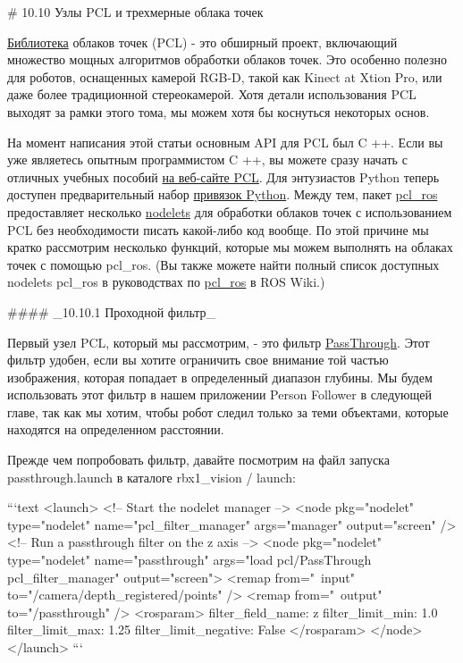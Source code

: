 # 10.10 Узлы PCL и трехмерные облака точек


\href{http://www.pointclouds.org/}{Библиотека} облаков точек (PCL) - это обширный проект, включающий множество мощных алгоритмов обработки облаков точек. Это особенно полезно для роботов, оснащенных камерой RGB-D, такой как Kinect at Xtion Pro, или даже более традиционной стереокамерой. Хотя детали использования PCL выходят за рамки этого тома, мы можем хотя бы коснуться некоторых основ.

На момент написания этой статьи основным API для PCL был C ++. Если вы уже являетесь опытным программистом C ++, вы можете сразу начать с отличных учебных пособий \href{http://www.pointclouds.org/documentation/tutorials/}{на веб-сайте PCL}. Для энтузиастов Python теперь доступен предварительный набор \href{http://www.pointclouds.org/news/2013/02/07/python-bindings-for-the-point-cloud-library/}{привязок Python}. Между тем, пакет \href{http://wiki.ros.org/pcl_ros}{pcl\_ros} предоставляет несколько \href{http://wiki.ros.org/nodelet}{nodelets} для обработки облаков точек с использованием PCL без необходимости писать какой-либо код вообще. По этой причине мы кратко рассмотрим несколько функций, которые мы можем выполнять на облаках точек с помощью pcl\_ros. (Вы также можете найти полный список доступных nodelets pcl\_ros в руководствах по \href{http://wiki.ros.org/pcl_ros/Tutorials}{pcl\_ros} в ROS Wiki.)

#### _10.10.1 Проходной фильтр_

Первый узел PCL, который мы рассмотрим, - это фильтр \href{http://wiki.ros.org/pcl_ros/Tutorials/PassThrough%20filtering}{PassThrough}. Этот фильтр удобен, если вы хотите ограничить свое внимание той частью изображения, которая попадает в определенный диапазон глубины. Мы будем использовать этот фильтр в нашем приложении Person Follower в следующей главе, так как мы хотим, чтобы робот следил только за теми объектами, которые находятся на определенном расстоянии.

Прежде чем попробовать фильтр, давайте посмотрим на файл запуска passthrough.launch в каталоге rbx1\_vision / launch:

```text
<launch>
<!-- Start the nodelet manager -->
<node pkg="nodelet" type="nodelet" name="pcl_filter_manager" args="manager" output="screen" />
<!-- Run a passthrough filter on the z axis -->
<node pkg="nodelet" type="nodelet" name="passthrough" args="load pcl/PassThrough pcl_filter_manager" output="screen">
<remap from="~input" to="/camera/depth_registered/points" /> <remap from="~output" to="/passthrough" />
<rosparam>
filter_field_name: z filter_limit_min: 1.0 filter_limit_max: 1.25 filter_limit_negative: False
</rosparam>
</node>
</launch>
```


